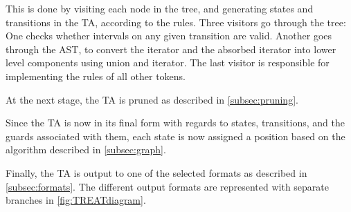 This is done by visiting each node in the tree, and generating states and transitions in the TA, according to the rules. Three visitors go through the tree: One checks whether intervals on any given transition are valid. Another goes through the AST, to convert the iterator and the absorbed iterator into lower level components using union and iterator. The last visitor is responsible for implementing the rules of all other tokens.

At the next stage, the TA is pruned as described in \cref{subsec:pruning}.

Since the TA is now in its final form with regards to states, transitions, and the guards associated with them, each state is now assigned a position based on the algorithm described in \cref{subsec:graph}.

Finally, the TA is output to one of the selected formats as described in \cref{subsec:formats}. The different output formats are represented with separate branches in \cref*{fig:TREATdiagram}.

